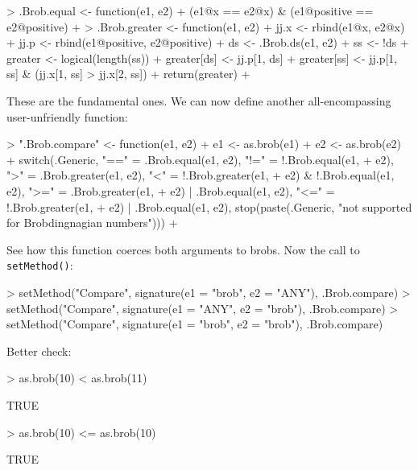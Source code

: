 \documentclass[a4paper]{article}
\begin{document}
\begin{Schunk}
\begin{Sinput}
> .Brob.equal <- function(e1, e2) {
+     (e1@x == e2@x) & (e1@positive == e2@positive)
+ }
> .Brob.greater <- function(e1, e2) {
+     jj.x <- rbind(e1@x, e2@x)
+     jj.p <- rbind(e1@positive, e2@positive)
+     ds <- .Brob.ds(e1, e2)
+     ss <- !ds
+     greater <- logical(length(ss))
+     greater[ds] <- jj.p[1, ds]
+     greater[ss] <- jj.p[1, ss] & (jj.x[1, ss] > jj.x[2, ss])
+     return(greater)
+ }
\end{Sinput}
\end{Schunk}

These are the fundamental ones.  We can now define another
all-encompassing user-unfriendly function:

\begin{Schunk}
\begin{Sinput}
> ".Brob.compare" <- function(e1, e2) {
+     e1 <- as.brob(e1)
+     e2 <- as.brob(e2)
+     switch(.Generic, "==" = .Brob.equal(e1, e2), "!=" = !.Brob.equal(e1, 
+         e2), ">" = .Brob.greater(e1, e2), "<" = !.Brob.greater(e1, 
+         e2) & !.Brob.equal(e1, e2), ">=" = .Brob.greater(e1, 
+         e2) | .Brob.equal(e1, e2), "<=" = !.Brob.greater(e1, 
+         e2) | .Brob.equal(e1, e2), stop(paste(.Generic, "not supported for Brobdingnagian numbers")))
+ }
\end{Sinput}
\end{Schunk}

See how this function coerces both arguments to brobs.
Now the call to {\tt setMethod()}:

\begin{Schunk}
\begin{Sinput}
> setMethod("Compare", signature(e1 = "brob", e2 = "ANY"), .Brob.compare)
> setMethod("Compare", signature(e1 = "ANY", e2 = "brob"), .Brob.compare)
> setMethod("Compare", signature(e1 = "brob", e2 = "brob"), .Brob.compare)
\end{Sinput}
\end{Schunk}

Better check:

\begin{Schunk}
\begin{Sinput}
> as.brob(10) < as.brob(11)
\end{Sinput}
\begin{Soutput}
[1] TRUE
\end{Soutput}
\begin{Sinput}
> as.brob(10) <= as.brob(10)
\end{Sinput}
\begin{Soutput}
[1] TRUE
\end{Soutput}
\end{Schunk}
\end{document}
